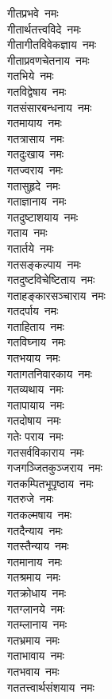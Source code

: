 \begin{multicols}{2}
\begin{flushleft}
गीतप्रभवे~नमः\\
गीतार्थतत्त्वविदे~नमः\\
गीतागीतविवेकज्ञाय~नमः\\
गीताप्रवणचेतनाय~नमः\\
गतभिये~नमः\\
गतविद्वेषाय~नमः\\
गतसंसारबन्धनाय~नमः\\
गतमायाय~नमः\hfill{}\\
गतत्रासाय~नमः\\
गतदुःखाय~नमः\\
गतज्वराय~नमः\\
गतासुहृदे~नमः\\
गताज्ञानाय~नमः\\
गतदुष्टाशयाय~नमः\\
गताय~नमः\\
गतार्तये~नमः\\
गतसङ्कल्पाय~नमः\\
गतदुष्टविचेष्टिताय~नमः\hfill{}\\
गताहङ्कारसञ्चाराय~नमः\\
गतदर्पाय~नमः\\
गताहिताय~नमः\\
गतविघ्नाय~नमः\\
गतभयाय~नमः\\
गतागतनिवारकाय~नमः\\
गतव्यथाय~नमः\\
गतापायाय~नमः\\
गतदोषाय~नमः\\
गतेः पराय~नमः\hfill{}\\
गतसर्वविकाराय~नमः\\
गजगञ्जितकुञ्जराय~नमः\\
गतकम्पितभूपृष्ठाय~नमः\\
गतरुजे~नमः\\
गतकल्मषाय~नमः\\
गतदैन्याय~नमः\\
गतस्तैन्याय~नमः\\
गतमानाय~नमः\\
गतश्रमाय~नमः\\
गतक्रोधाय~नमः\hfill{}\\
गतग्लानये~नमः\\
गतम्लानाय~नमः\\
गतभ्रमाय~नमः\\
गताभावाय~नमः\\
गतभवाय~नमः\\
गततत्त्वार्थसंशयाय~नमः\\

\end{flushleft}
\end{multicols}

